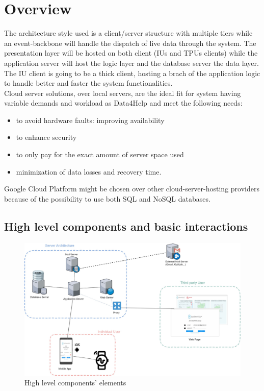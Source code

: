 \section{Overview}
The architecture style used is a client/server structure with multiple tiers while an event-backbone will handle the dispatch of live data through the system. The presentation layer will be hosted on both client (IUs and TPUs clients) while the application server will host the logic layer and the database server the data layer. The IU client is going to be a thick client, hosting a brach of the application logic to handle better and faster the system functionalities. \\ 
Cloud server solutions, over local servers, are the ideal fit for system having variable demands and workload as Data4Help and meet the following needs:
\begin{itemize}
\item to avoid hardware faults: improving availability
\item to enhance security
\item to only pay for the exact amount of server space used
\item minimization of data losses and recovery time. 
\end{itemize} 
Google Cloud Platform might be chosen over other cloud-server-hosting providers because of the possibility to use both SQL and NoSQL databases.
\clearpage 
\subsection{High level components and basic interactions}
\begin{figure}[h]
\caption{High level components' elements}
\includegraphics[width = \textwidth]{sections/architecturalDesign/overview_1.jpg}
\end{figure}

